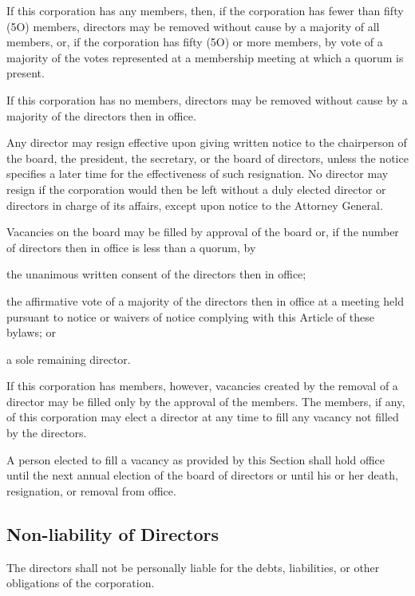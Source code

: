 \documentclass{article}
\begin{document}
	If this corporation has any members, then, if the corporation has fewer than fifty (5O) members, directors may be removed without cause by a majority of all members, or, if the corporation has fifty (5O) or more members, by vote of a majority of the votes represented at a membership meeting at which a quorum is present.
	
	If this corporation has no members, directors may be removed without cause by a majority of the directors then in office.
	
	Any director may resign effective upon giving written notice to the chairperson of the board, the president, the secretary, or the board of directors, unless the notice specifies a later time for the effectiveness of such resignation. No director may resign if the corporation would then be left without a duly elected director or directors in charge of its affairs, except upon notice to the Attorney General.
	
	Vacancies on the board may be filled by approval of the board or, if the number of directors then in office is less than a quorum, by
	\begin{inparaenum}[\itshape 1\upshape)]
		\item the unanimous written consent of the directors then in office; 
		\item the affirmative vote of a majority of the directors then in office at a meeting held pursuant to notice or waivers of notice complying with this Article of these bylaws; or 
		\item a sole remaining director. 
	\end{inparaenum}
	If this corporation has members, however, vacancies created by the removal of a director may be filled only by the approval of the members. The members, if any, of this corporation may elect a director at any time to fill any vacancy not filled by the directors.
	
	A person elected to fill a vacancy as provided by this Section shall hold office until the next annual election of the board of directors or until his or her death, resignation, or removal from office.
	
	\subsection{Non-liability of Directors}
	The directors shall not be personally liable for the debts, liabilities, or other obligations of the corporation.
	
	
\end{document}
